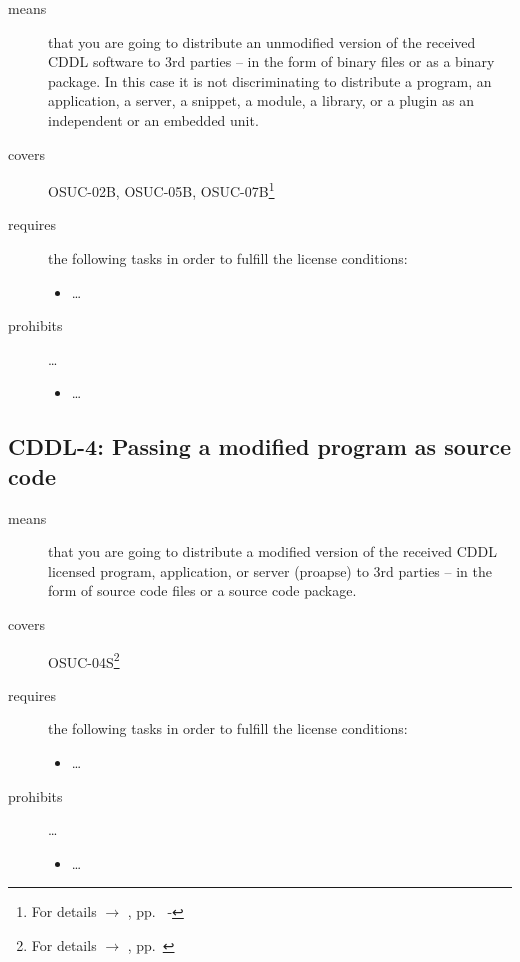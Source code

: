 \begin{description}
\item[means] that you are going to distribute an unmodified version of the
received CDDL software to 3rd parties -- in the form of binary files or as a
bi\-na\-ry package. In this case it is not discriminating to distribute a
program, an application, a server, a snippet, a module, a library, or a plugin
as an independent or an embedded unit.

\item[covers] OSUC-02B, OSUC-05B, OSUC-07B\footnote{For details $\rightarrow$
\oslic, pp.\ \pageref{OSUC-02B-DEF} - \pageref{OSUC-07B-DEF}}

\item[requires] the following tasks in order to fulfill the license conditions:
\begin{itemize}
  
  \item \ldots
  
\end{itemize}

\item[prohibits] \ldots
\begin{itemize}
  \item \ldots
\end{itemize}
\end{description}


\subsection{CDDL-4: Passing a modified program as source code}
\label{OSUC-04S-CDDL} 

\begin{description}
\item[means] that you are going to distribute a modified version of the received
CDDL licensed program, application, or server (proapse) to 3rd parties -- in the
form of source code files or a source code package.
\item[covers] OSUC-04S\footnote{For details $\rightarrow$ \oslic, pp.\
\pageref{OSUC-04S-DEF}}
\item[requires] the following tasks in order to fulfill the license conditions:
\begin{itemize}
  
  \item \ldots
  
\end{itemize}

\item[prohibits] \ldots
\begin{itemize}
  \item \ldots
\end{itemize}
\end{description}

